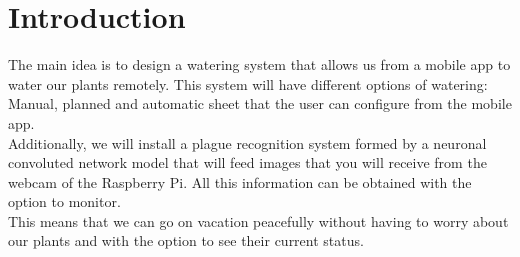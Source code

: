 \documentclass[11pt,a4paper]{article}
\begin{document}
\renewcommand{\headrulewidth}{0.5pt}
\renewcommand{\footrulewidth}{0.5pt}
\fancypagestyle{plain}{
\fancyhead[L]{}
\fancyhead[C]{}
\fancyhead[R]{\thepage}
\fancyfoot[L]{}
\fancyfoot[C]{}
\fancyfoot[R]{}
\renewcommand{\headrulewidth}{0pt}
\renewcommand{\footrulewidth}{0pt}
}
\pagestyle{fancy}
\vspace*{0.05in}

\tableofcontents
\vspace*{0.3in}
\newpage

\part*{Introduction}
The main idea is to design a watering system that allows us from a mobile app to water our plants remotely. This system will have different options of watering: Manual, planned and automatic sheet that the user can configure from the mobile app.\\

Additionally, we will install a plague recognition system formed by a neuronal convoluted network model that will feed images that you will receive from the webcam of the Raspberry Pi. All this information can be obtained with the option to monitor.\\

This means that we can go on vacation peacefully without having to worry about our plants and with the option to see their current status.
\end{document}
